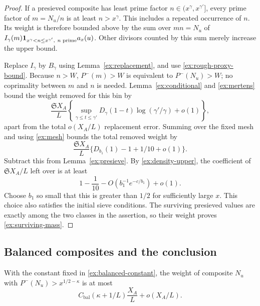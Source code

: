 \begin{proof}
If a presieved composite has least prime factor
$n\in(x^\gamma,x^{\gamma'}]$, every prime factor of $m=N_u/n$
is at least $n>x^\gamma$. This includes a repeated occurrence of
$n$. Its weight is therefore bounded above by the sum over
$mn=N_u$ of $I_\gamma(m)\mathbf{1}_{x^\gamma<n\le x^{\gamma'},\ n\text{ prime}}
a_x(u)$. Other divisors counted by this sum merely increase the
upper bound.

Replace $I_\gamma$ by $B_\gamma$ using
Lemma~\ref{ex:replacement}, and use \eqref{ex:rough-proxy-bound}.
Because $n>W$, $P^-(m)>W$ is equivalent to $P^-(N_u)>W$; no
coprimality between $m$ and $n$ is needed. Lemma~\ref{ex:conditional}
and \eqref{ex:mertens} bound the weight removed for this bin by
\[
 \frac{\mathfrak S X_A}{L}
 \left\{\sup_{\gamma\le t\le\gamma'}D_\gamma(1-t)
                       \log(\gamma'/\gamma)+o(1)\right\},
\]
apart from the total $o(X_A/L)$ replacement error. Summing over
the fixed mesh and using \eqref{ex:mesh} bounds the total removed
weight by
\[
 \frac{\mathfrak S X_A}{L}
       \{D_{b_1}(1)-1+1/10+o(1)\}.
\]
Subtract this from Lemma~\ref{ex:presieve}. By
\eqref{ex:density-upper}, the coefficient of
$\mathfrak S X_A/L$ left over is at least
\[
 1-\frac1{10}-O(b_1^{-1}e^{-c/b_1})+o(1).
\]
Choose $b_1$ so small that this is greater than $1/2$ for
sufficiently large $x$. This choice also satisfies the initial
sieve conditions. The surviving presieved values are exactly
among the two classes in the assertion, so their weight proves
\eqref{ex:surviving-mass}.
\end{proof}

\subsection{Balanced composites and the conclusion}

\begin{lemma}\label{ex:balanced}
With the constant fixed in \eqref{ex:balanced-constant}, the weight
of composite $N_u$ with $P^-(N_u)>x^{1/2-\kappa}$ is at most
\begin{equation}\label{ex:balanced-bound}
 C_{\mathrm{bal}}(\kappa+1/L)\frac{X_A}{L}+o(X_A/L).
\end{equation}
\end{lemma}

